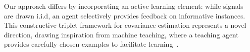Our approach differs by incorporating an active learning element: while signals are drawn i.i.d, an agent selectively provides feedback on informative instances. This constructive triplet framework for covariance estimation represents a novel direction, drawing inspiration from machine teaching, where a teaching agent provides carefully chosen examples to facilitate learning~\citep{zhu2018overviewmachineteaching}.
